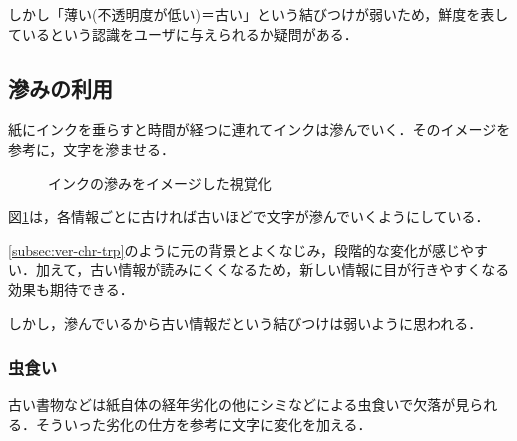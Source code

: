 しかし「薄い(不透明度が低い)＝古い」という結びつけが弱いため，鮮度を表しているという認識をユーザに与えられるか疑問がある．

\subsection{滲みの利用}
\label{subsec:ver-chr-bld}

紙にインクを垂らすと時間が経つに連れてインクは滲んでいく．そのイメージを参考に，文字を滲ませる．

\begin{figure}[htbp]
  \begin{center}
  \end{center}
  \caption{インクの滲みをイメージした視覚化}
  \label{fig:ver-bleeding}
\end{figure}

図\ref{fig:ver-bleeding}は，各情報ごとに古ければ古いほどで文字が滲んでいくようにしている．

\ref{subsec:ver-chr-trp}のように元の背景とよくなじみ，段階的な変化が感じやすい．加えて，古い情報が読みにくくなるため，新しい情報に目が行きやすくなる効果も期待できる．

しかし，滲んでいるから古い情報だという結びつけは弱いように思われる．

\subsubsection{虫食い}
\label{subsec:ver-chr-wh}

古い書物などは紙自体の経年劣化の他にシミなどによる虫食いで欠落が見られる．そういった劣化の仕方を参考に文字に変化を加える．

